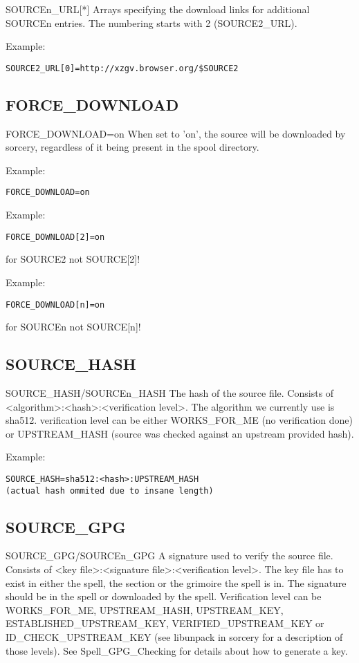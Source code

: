 \documentclass[a4paper,10pt]{book}
\begin{document}
SOURCEn\_URL[*]
	Arrays specifying the download links for additional SOURCEn entries.
	The numbering starts with 2 (SOURCE2\_URL).

Example:
\begin{verbatim}
SOURCE2_URL[0]=http://xzgv.browser.org/$SOURCE2
\end{verbatim}

\subsection{FORCE\_DOWNLOAD}
FORCE\_DOWNLOAD=on
	When set to 'on', the source will be downloaded by sorcery,
	regardless of it being present in the spool directory.

Example:
\begin{verbatim}
FORCE_DOWNLOAD=on
\end{verbatim}

Example:
\begin{verbatim}
FORCE_DOWNLOAD[2]=on
\end{verbatim}
for SOURCE2 not SOURCE[2]!

Example:
\begin{verbatim}
FORCE_DOWNLOAD[n]=on
\end{verbatim}
for SOURCEn not SOURCE[n]!

\subsection{SOURCE\_HASH}
SOURCE\_HASH/SOURCEn\_HASH
	The hash of the source file. Consists of
	<algorithm>:<hash>:<verification level>. The algorithm we currently
	use is sha512. verification level can be either WORKS\_FOR\_ME (no
	verification done) or UPSTREAM\_HASH (source was checked against an
	upstream provided hash).

Example:
\begin{verbatim}
SOURCE_HASH=sha512:<hash>:UPSTREAM_HASH
(actual hash ommited due to insane length)
\end{verbatim}

\subsection{SOURCE_GPG}
SOURCE\_GPG/SOURCEn\_GPG
	A signature used to verify the source file. Consists of
	<key file>:<signature file>:<verification level>. The key file has to
	exist in either the spell, the section or the grimoire the spell is
	in. The signature should be in the spell or downloaded by the spell.
	Verification level can be WORKS\_FOR\_ME, UPSTREAM\_HASH,
UPSTREAM\_KEY,
	ESTABLISHED\_UPSTREAM\_KEY, VERIFIED\_UPSTREAM\_KEY or
	ID\_CHECK\_UPSTREAM\_KEY (see libunpack in sorcery for a description of
	those levels). See Spell\_GPG\_Checking for details about how to
	generate a key.
\end{document}

